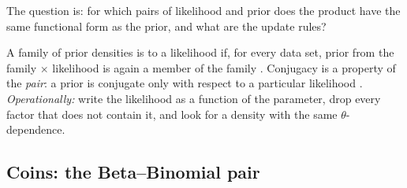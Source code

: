 The question is: for which pairs of likelihood and prior does the product have the same
functional form as the prior, and what are the update rules?

\begin{workdef}
A family of prior densities is  to a likelihood if, for every data
set, prior from the family $\times$ likelihood is again a member of the family
. Conjugacy is a property of the \emph{pair}: a prior is conjugate only
with respect to a particular likelihood . \emph{Operationally:}
write the likelihood as a function of the parameter, drop every factor that does not
contain it, and look for a density with the same $\theta$-dependence.
\end{workdef}

\subsection{Coins: the Beta--Binomial pair}

